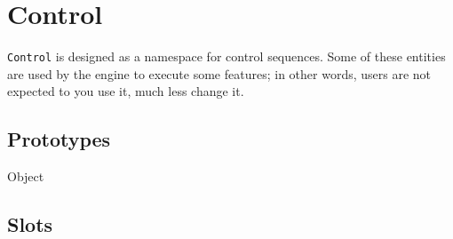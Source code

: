 
\section{Control}

\lstinline|Control| is designed as a namespace for control sequences.
Some of these entities are used by the \urbi engine to execute some
\us features; in other words, users are not expected to you use it,
much less change it.

\subsection{Prototypes}

\begin{refObjects}
\item[Object]
\end{refObjects}

\subsection{Slots}


